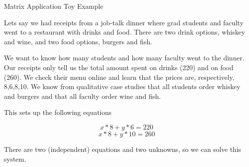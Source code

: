 \documentclass[11pt]{beamer}
\begin{document}
\begin{frame}{Matrix Application Toy Example}

Lets say we had receipts from a job-talk dinner where grad students and faculty went to a restaurant with drinks and food. There are two drink options, whiskey and wine, and two food options, burgers and fish. \\
\vspace{3mm}

We want to know how many students and how many faculty went to the dinner. Our receipts only tell us the total amount spent on drinks (220) and on food (260). We check their menu online and learn that the prices are, respectively, 8,6,8,10. We know from qualitative case studies that all students order whiskey and burgers and that all faculty order wine and fish. \\
\vspace{3mm}

This sets up the following equations

$$x*8 + y*6 = 220$$
$$x*8 + y*10 = 260$$

There are two (independent) equations and two unknowns, so we can solve this system. 
\end{frame}
\end{document}
